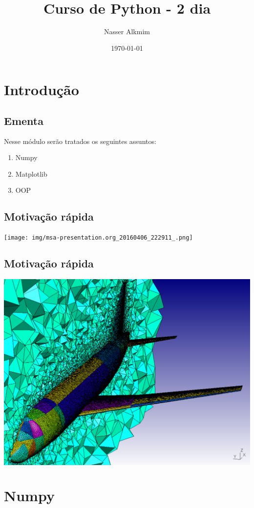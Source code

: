 \documentclass[presentation]{beamer}
\author{Nasser Alkmim}
\date{\today}
\title{Curso de Python - 2 dia}
\begin{document}
\maketitle

\section{Introdução}
\label{sec:orgheadline4}
\subsection{Ementa}
\label{sec:orgheadline1}
Nesse módulo serão tratados os seguintes assuntos:

\begin{enumerate}
\item Numpy
\item Matplotlib
\item OOP
\end{enumerate}
\subsection{Motivação rápida}
\label{sec:orgheadline2}


\texttt{[image: img/msa-presentation.org\_20160406\_222911\_.png]}
\subsection{Motivação rápida}
\label{sec:orgheadline3}


\includegraphics[width=.9\linewidth]{img/Introdução/Capture_2016-08-10_14-57-31.PNG}

\section{Numpy}
\label{sec:orgheadline26}
\end{document}
